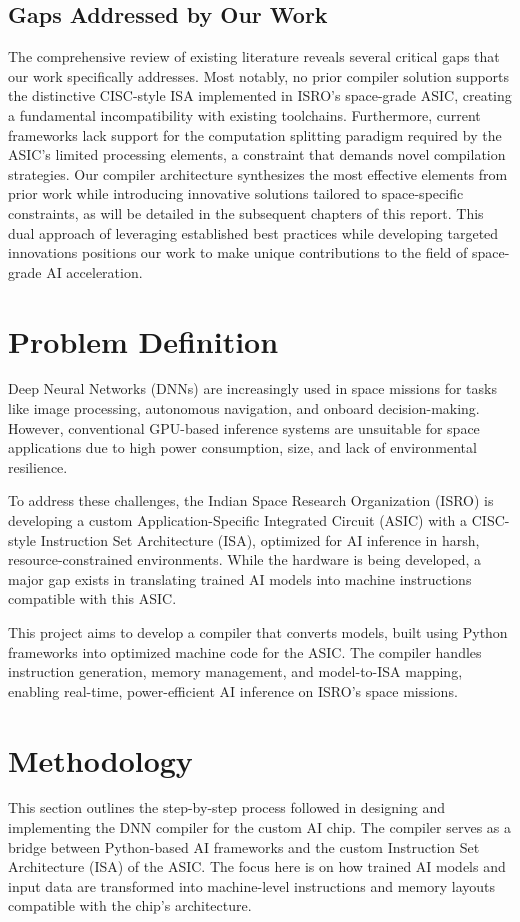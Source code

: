 \documentclass[12pt]{report}
\begin{document}
\section{Gaps Addressed by Our Work}
The comprehensive review of existing literature reveals several critical gaps that our work specifically addresses. Most notably, no prior compiler solution supports the distinctive CISC-style ISA implemented in ISRO's space-grade ASIC, creating a fundamental incompatibility with existing toolchains. Furthermore, current frameworks lack support for the computation splitting paradigm required by the ASIC's limited processing elements, a constraint that demands novel compilation strategies. Our compiler architecture synthesizes the most effective elements from prior work while introducing innovative solutions tailored to space-specific constraints, as will be detailed in the subsequent chapters of this report. This dual approach of leveraging established best practices while developing targeted innovations positions our work to make unique contributions to the field of space-grade AI acceleration.
\chapter{Problem Definition}

Deep Neural Networks (DNNs) are increasingly used in space missions for tasks like image processing, autonomous navigation, and onboard decision-making. However, conventional GPU-based inference systems are unsuitable for space applications due to high power consumption, size, and lack of environmental resilience.

To address these challenges, the Indian Space Research Organization (ISRO) is developing a custom Application-Specific Integrated Circuit (ASIC) with a CISC-style Instruction Set Architecture (ISA), optimized for AI inference in harsh, resource-constrained environments. While the hardware is being developed, a major gap exists in translating trained AI models into machine instructions compatible with this ASIC.

This project aims to develop a compiler that converts models, built using Python frameworks into optimized machine code for the ASIC. The compiler handles instruction generation, memory management, and model-to-ISA mapping, enabling real-time, power-efficient AI inference on ISRO’s space missions.

\chapter{Methodology}
This section outlines the step-by-step process followed in designing and implementing the DNN compiler for the custom AI chip. The compiler serves as a bridge between Python-based AI frameworks and the custom Instruction Set Architecture (ISA) of the ASIC. The focus here is on how trained AI models and input data are transformed into machine-level instructions and memory layouts compatible with the chip's architecture. 
\end{document}

